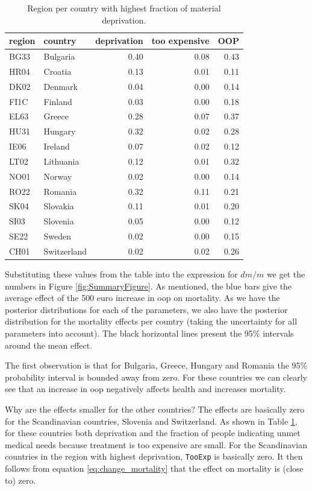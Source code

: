 \documentclass[a4paper,12pt]{article}
\begin{document}
\begin{table}[htbp]
\caption{\label{tab:region_per_country}Region per country with highest fraction of material deprivation.}
\centering
\begin{tabular}{llrrr}
region & country & deprivation & too expensive & OOP\\
\hline
BG33 & Bulgaria & 0.40 & 0.08 & 0.43\\
HR04 & Croatia & 0.13 & 0.01 & 0.11\\
DK02 & Denmark & 0.04 & 0.00 & 0.14\\
FI1C & Finland & 0.03 & 0.00 & 0.18\\
EL63 & Greece & 0.28 & 0.07 & 0.37\\
HU31 & Hungary & 0.32 & 0.02 & 0.28\\
IE06 & Ireland & 0.07 & 0.02 & 0.12\\
LT02 & Lithuania & 0.12 & 0.01 & 0.32\\
NO01 & Norway & 0.02 & 0.00 & 0.14\\
RO22 & Romania & 0.32 & 0.11 & 0.21\\
SK04 & Slovakia & 0.11 & 0.01 & 0.20\\
SI03 & Slovenia & 0.05 & 0.00 & 0.12\\
SE22 & Sweden & 0.02 & 0.00 & 0.15\\
CH01 & Switzerland & 0.02 & 0.02 & 0.26\\
\end{tabular}
\end{table}

Substituting these values from the table into the expression for \(dm/m\) we get the numbers in Figure \ref{fig:SummaryFigure}. As mentioned, the blue bars give the average effect of the 500 euro increase in oop on mortality. As we have the posterior distributions for each of the parameters, we also have the posterior distribution for the mortality effects per country (taking the uncertainty for all parameters into account). The black horizontal lines present the 95\% intervals around the mean effect. 

The first observation is that for Bulgaria, Greece, Hungary and Romania the 95\% probability interval is bounded away from zero. For these countries we can clearly see that an increase in oop negatively affects health and increases mortality. 

Why are the effects smaller for the other countries? The effects are basically zero for the Scandinavian countries, Slovenia and Switzerland. As shown in Table \ref{tab:region_per_country}, for these countries both deprivation and the fraction of people indicating unmet medical needs because treatment is too expensive are small. For the Scandinavian countries in the region with highest deprivation, \texttt{TooExp} is basically zero. It then follows from equation \eqref{eq:change_mortality} that the effect on mortality is (close to) zero.
\end{document}
